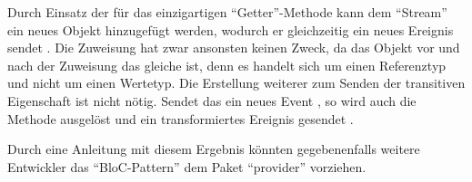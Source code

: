 Durch Einsatz der für das  einzigartigen \enquote{Getter}-Methode  kann dem \enquote{Stream} ein neues Objekt hinzugefügt werden,
wodurch er gleichzeitig ein neues Ereignis sendet .
Die Zuweisung hat zwar ansonsten keinen Zweck,
da das Objekt vor und nach der Zuweisung das gleiche ist,
denn es handelt sich um einen Referenztyp und nicht um einen Wertetyp.
Die Erstellung weiterer  zum Senden der transitiven Eigenschaft  ist nicht nötig.
Sendet das   ein neues Event ,
so wird auch die Methode  ausgelöst und ein transformiertes Ereignis gesendet .

Durch eine Anleitung mit diesem Ergebnis könnten gegebenenfalls weitere Entwickler das \enquote{BloC-Pattern} dem Paket \enquote{provider} vorziehen.

